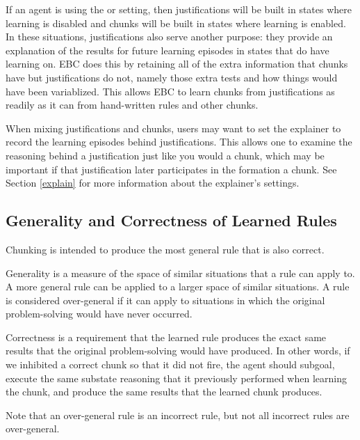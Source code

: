 If an agent is using the  or  setting, then justifications will be built in states where learning is disabled and chunks will be built in states where learning is enabled.  In these situations, justifications also serve another purpose:  they provide an explanation of the results for future learning episodes in states that do have learning on.  EBC does this by retaining all of the extra information that chunks have but justifications do not, namely those extra tests and how things would have been variablized.  This allows EBC to learn chunks from justifications as readily as it can from hand-written rules and other chunks.

When mixing justifications and chunks, users may want to set the explainer to record the learning episodes behind justifications.  This allows one to examine the reasoning behind a justification just like you would a chunk, which may be important if that justification later participates in the formation a chunk. See Section \ref{explain} for more information about the explainer's settings.

\subsection{Generality and Correctness of Learned Rules}
\label{CHUNKING-correctness}

Chunking is intended to produce the most general rule that is also correct. 

Generality is a measure of the space of similar situations that a rule can apply to.  A more general rule can be applied to a larger space of similar situations.  A rule is considered over-general if it can apply to situations in which the original problem-solving would have never occurred.  

Correctness is a requirement that the learned rule produces the exact same results that the original problem-solving would have produced.  In other words, if we inhibited a correct chunk so that it did not fire, the agent should subgoal, execute the same substate reasoning that it previously performed when learning the chunk, and produce the same results that the learned chunk produces.

Note that an over-general rule is an incorrect rule, but not all incorrect rules are over-general.  


